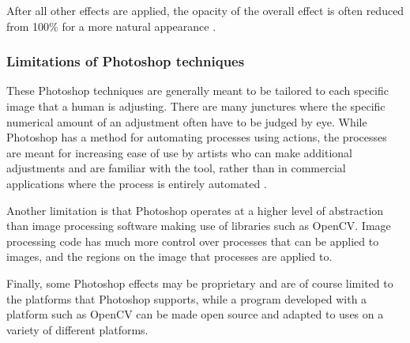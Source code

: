 After all other effects are applied, the opacity of the overall effect is often reduced from 100\% for a more natural appearance \cite{photoshop:obama} \cite{photoshop:match_body}.

\subsubsection*{Limitations of Photoshop techniques}
These Photoshop techniques are generally meant to be tailored to each specific image that a human is adjusting. There are many junctures where the specific numerical amount of an adjustment often have to be judged by eye. While Photoshop has a method for automating processes using actions, the processes are meant for increasing ease of use by artists who can make additional adjustments and are familiar with the tool, rather than in commercial applications where the process is entirely automated \cite{photoshop:actions}.

Another limitation is that Photoshop operates at a higher level of abstraction than image processing software making use of libraries such as OpenCV. Image processing code has much more control over processes that can be applied to images, and the regions on the image that processes are applied to. 

Finally, some Photoshop effects may be proprietary and are of course limited to the platforms that Photoshop supports, while a program developed with a platform such as OpenCV can be made open source and adapted to uses on a variety of different platforms.